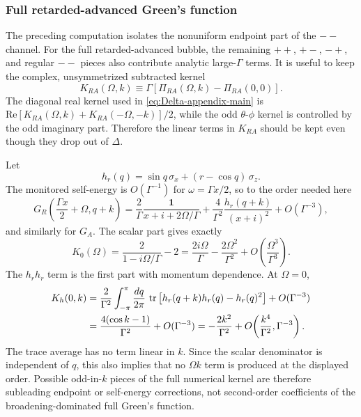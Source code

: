 \documentclass[aps,prx,preprint,amsmath,amssymb]{revtex4-2}
\newcommand{\tr}{{\rm \, tr\,}}
\renewcommand{\Re}{\text{Re}}
\begin{document}
\subsubsection{Full retarded-advanced Green's function}

The preceding computation isolates the nonuniform endpoint part of the
\(--\) channel.  For the full retarded-advanced bubble, the remaining
\(++\), \(+-\), \(-+\), and regular \(--\) pieces also contribute analytic
large-\(\Gamma\) terms.  It is useful to keep the complex, unsymmetrized
subtracted kernel
\begin{equation}
\label{eq:KRA-full-def-app}
K_{RA}(\Omega,k)
\equiv
\Gamma\left[\Pi_{RA}(\Omega,k)-\Pi_{RA}(0,0)\right].
\end{equation}
The diagonal real kernel used in \eqref{eq:Delta-appendix-main} is
\(\Re[K_{RA}(\Omega,k)+K_{RA}(-\Omega,-k)]/2\), while the odd
\(\theta\)-\(\phi\) kernel is controlled by the odd imaginary part.  Therefore
the linear terms in \(K_{RA}\) should be kept even though they drop out of
\(\Delta\).

Let
\begin{equation}
h_r(q)=\sin q\,\sigma_x+(r-\cos q)\,\sigma_z.
\end{equation}
The monitored self-energy is \(O(\Gamma^{-1})\) for
\(\omega=\Gamma x/2\), so to the order needed here
\begin{equation}
G_R\!\left(\frac{\Gamma x}{2}+\Omega,q+k\right)
=
\frac{2}{\Gamma}\frac{\mathbf{1}}{x+i+2\Omega/\Gamma}
+
\frac{4}{\Gamma^2}\frac{h_r(q+k)}{(x+i)^2}
+O(\Gamma^{-3}),
\end{equation}
and similarly for \(G_A\).  The scalar part gives exactly
\begin{equation}
\label{eq:full-scalar-largeGamma-app}
K_0(\Omega)
=
\frac{2}{1-i\Omega/\Gamma}-2
=
\frac{2i\Omega}{\Gamma}
-\frac{2\Omega^2}{\Gamma^2}
+O\!\left(\frac{\Omega^3}{\Gamma^3}\right).
\end{equation}
The \(h_r h_r\) term is the first part with momentum dependence.  At
\(\Omega=0\),
\begin{align}
K_h(0,k)
&=
\frac{2}{\Gamma^2}
\int_{-\pi}^{\pi}\frac{dq}{2\pi}\,
\tr\!\left[
h_r(q+k)h_r(q)-h_r(q)^2
\right]
+O(\Gamma^{-3})
\notag\\
&=
\frac{4(\cos k-1)}{\Gamma^2}
+O(\Gamma^{-3})
=
-\frac{2k^2}{\Gamma^2}
+O\!\left(\frac{k^4}{\Gamma^2},\Gamma^{-3}\right).
\label{eq:full-hh-largeGamma-app}
\end{align}
The trace average has no term linear in \(k\).  Since the scalar denominator is
independent of \(q\), this also implies that no \(\Omega k\) term is produced
at the displayed order.  Possible odd-in-\(k\) pieces of the full numerical
kernel are therefore subleading endpoint or self-energy corrections, not
second-order coefficients of the broadening-dominated full Green's function.
\end{document}
